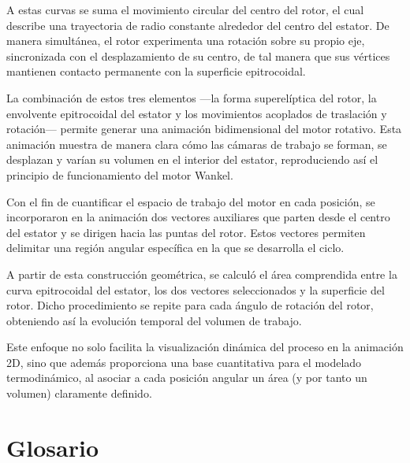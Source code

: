 \documentclass{LS}
\begin{document}
A estas curvas se suma el movimiento circular del centro del rotor, el cual describe una trayectoria de radio constante alrededor del centro del estator. De manera simultánea, el rotor experimenta una rotación sobre su propio eje, sincronizada con el desplazamiento de su centro, de tal manera que sus vértices mantienen contacto permanente con la superficie epitrocoidal.

La combinación de estos tres elementos —la forma superelíptica del rotor, la envolvente epitrocoidal del estator y los movimientos acoplados de traslación y rotación— permite generar una animación bidimensional del motor rotativo. Esta animación muestra de manera clara cómo las cámaras de trabajo se forman, se desplazan y varían su volumen en el interior del estator, reproduciendo así el principio de funcionamiento del motor Wankel.

Con el fin de cuantificar el espacio de trabajo del motor en cada posición, se incorporaron en la animación dos vectores auxiliares que parten desde el centro del estator y se dirigen hacia las puntas del rotor. Estos vectores permiten delimitar una región angular específica en la que se desarrolla el ciclo.

A partir de esta construcción geométrica, se calculó el área comprendida entre la curva epitrocoidal del estator, los dos vectores seleccionados y la superficie del rotor. Dicho procedimiento se repite para cada ángulo de rotación del rotor, obteniendo así la evolución temporal del volumen de trabajo.

Este enfoque no solo facilita la visualización dinámica del proceso en la animación 2D, sino que además proporciona una base cuantitativa para el modelado termodinámico, al asociar a cada posición angular un área (y por tanto un volumen) claramente definido.

\section{Glosario}
\end{document}
